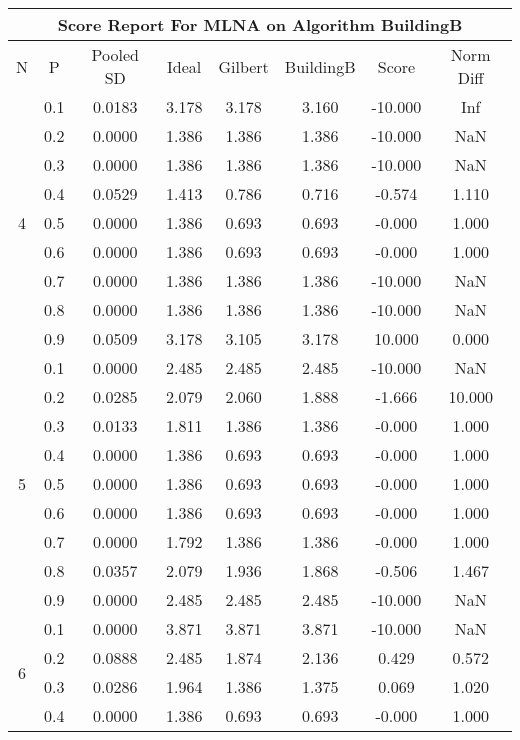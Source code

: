 \documentclass[11pt,a4paper]{report}
\begin{document}
\begin{longtable}{ | c | c || c | c | c | c | c | c | }
\hline
\multicolumn{8}{|c|}{ Score Report For MLNA on Algorithm BuildingB} \\
\hline
N & P & Pooled SD &  Ideal &  Gilbert & BuildingB  & Score & Norm Diff \\
 \hline
 \hline
 \endhead
\multirow{9}{*}{4} & 0.1 & 0.0183 & 3.178 & 3.178 & 3.160 & -10.000 & Inf \\
 & 0.2 & 0.0000 & 1.386 & 1.386 & 1.386 & -10.000 & NaN \\
 & 0.3 & 0.0000 & 1.386 & 1.386 & 1.386 & -10.000 & NaN \\
 & 0.4 & 0.0529 & 1.413 & 0.786 & 0.716 & -0.574 & 1.110 \\
 & 0.5 & 0.0000 & 1.386 & 0.693 & 0.693 & -0.000 & 1.000 \\
 & 0.6 & 0.0000 & 1.386 & 0.693 & 0.693 & -0.000 & 1.000 \\
 & 0.7 & 0.0000 & 1.386 & 1.386 & 1.386 & -10.000 & NaN \\
 & 0.8 & 0.0000 & 1.386 & 1.386 & 1.386 & -10.000 & NaN \\
 & 0.9 & 0.0509 & 3.178 & 3.105 & 3.178 & 10.000 & 0.000 \\
 \hline
\multirow{9}{*}{5} & 0.1 & 0.0000 & 2.485 & 2.485 & 2.485 & -10.000 & NaN \\
 & 0.2 & 0.0285 & 2.079 & 2.060 & 1.888 & -1.666 & 10.000 \\
 & 0.3 & 0.0133 & 1.811 & 1.386 & 1.386 & -0.000 & 1.000 \\
 & 0.4 & 0.0000 & 1.386 & 0.693 & 0.693 & -0.000 & 1.000 \\
 & 0.5 & 0.0000 & 1.386 & 0.693 & 0.693 & -0.000 & 1.000 \\
 & 0.6 & 0.0000 & 1.386 & 0.693 & 0.693 & -0.000 & 1.000 \\
 & 0.7 & 0.0000 & 1.792 & 1.386 & 1.386 & -0.000 & 1.000 \\
 & 0.8 & 0.0357 & 2.079 & 1.936 & 1.868 & -0.506 & 1.467 \\
 & 0.9 & 0.0000 & 2.485 & 2.485 & 2.485 & -10.000 & NaN \\
 \hline
\multirow{9}{*}{6} & 0.1 & 0.0000 & 3.871 & 3.871 & 3.871 & -10.000 & NaN \\
 & 0.2 & 0.0888 & 2.485 & 1.874 & 2.136 & 0.429 & 0.572 \\
 & 0.3 & 0.0286 & 1.964 & 1.386 & 1.375 & 0.069 & 1.020 \\
 & 0.4 & 0.0000 & 1.386 & 0.693 & 0.693 & -0.000 & 1.000 \\

\end{longtable}
\end{document}
